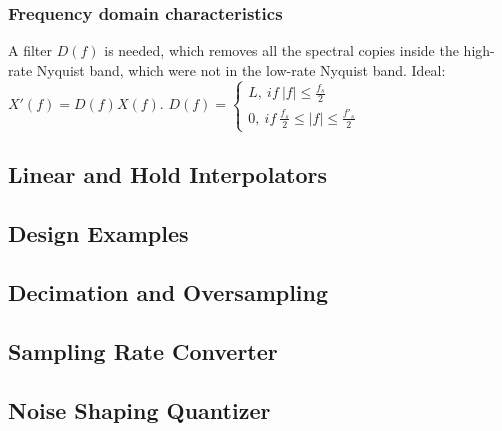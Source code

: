 \subsubsection{Frequency domain characteristics}
A filter $D(f)$ is needed, which removes all the spectral copies inside the high-rate Nyquist band, which were not in the low-rate Nyquist band. Ideal: $X'(f) = D(f)X(f)$.
$D(f)=\begin{cases} L,\ if\ |f|\leq\frac{f_s}{2}\\
0,\ if\ \frac{f_s}{2}\leq |f|\leq\frac{f'_s}{2}
\end{cases}$
\subsection{Linear and Hold Interpolators}
\subsection{Design Examples}
\subsection{Decimation and Oversampling}
\subsection{Sampling Rate Converter}
\subsection{Noise Shaping Quantizer}



